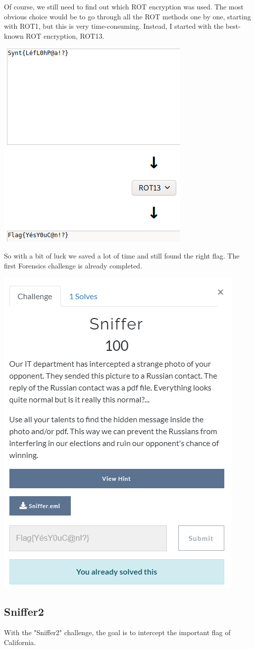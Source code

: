 \documentclass[../main.tex]{subfiles}
\begin{document}
Of course, we still need to find out which ROT encryption was used. The most obvious choice would be to go through all the ROT methods one by one, starting with ROT1, but this is very time-consuming. Instead, I started with the best-known ROT encryption, ROT13.
 \begin{center}
    \includegraphics[width=0.5\linewidth]{images/Robbe/sniffer_writeup5.png}
\end{center}

So with a bit of luck we saved a lot of time and still found the right flag. The first Forensics challenge is already completed.
 \begin{center}
    \includegraphics[width=0.5\linewidth]{images/Robbe/sniffer_writeup8.png}
\end{center}
\pagebreak

\subsection{Sniffer2}
With the "Sniffer2" challenge, the goal is to intercept the important flag of California. 
\end{document}
